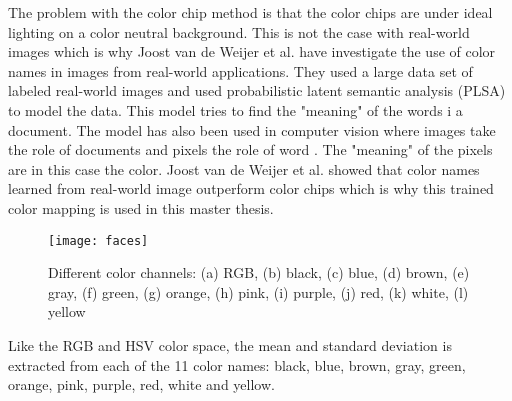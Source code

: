 The problem with the color chip method is that the color chips are under ideal lighting on a color neutral background. This is not the case with real-world images which is why Joost van de Weijer et al. \cite{11_colours} have investigate the use of color names in images from real-world applications. They used a large data set of labeled real-world images and used probabilistic latent semantic analysis (PLSA) \cite{hofmann1999probabilistic} to model the data. This model tries to find the "meaning" of the words i a document. The model has also been used in computer vision where images take the role of documents and pixels the role of word \cite{barnard2003matching}. The "meaning" of the pixels are in this case the color. Joost van de Weijer et al. showed that color names learned from real-world image outperform color chips which is why this trained color mapping is used in this master thesis. 

\FloatBarrier
\begin{figure}[h]
	\centering
	\texttt{[image: faces]}
	\caption{Different color channels: (a) RGB, (b) black, (c) blue, (d) brown, (e) gray, (f) green, (g) orange, (h) pink, (i) purple, (j) red, (k) white, (l) yellow  \label{fig:color_channels}}
\end{figure}
\FloatBarrier

Like the RGB and HSV color space, the mean and standard deviation is extracted from each of the 11 color names: black, blue, brown, gray, green, orange, pink, purple, red, white and yellow. 




%
%
%

